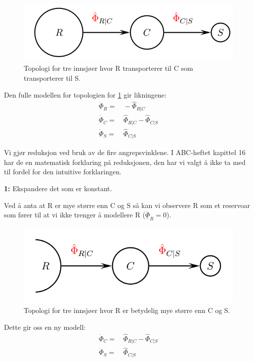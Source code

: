 \begin{figure}[H]
    \centering
    \includegraphics[scale=0.5]{Figures/time_scale_topo}
    \caption{Topologi for tre innsjøer hvor R transporterer til C som transporterer til S.}
    \label{fig:time_scale_topo}
\end{figure}

Den fulle modellen for topologien for \cref{fig:time_scale_topo} gir likningene:
\begin{align}
    \dot{\Phi}_{R} =&\, -\hat{\Phi}_{R|C} \\
    \dot{\Phi}_C =&\, \hat{\Phi}_{R|C} - \hat{\Phi}_{C|S}\\
    \dot{\Phi}_S =&\, \hat{\Phi}_{C|S}
\end{align}

Vi gjør reduksjon ved bruk av de fire angrepsvinklene. I ABC-heftet kapittel 16 har de en matematisk forklaring på reduksjonen, den har vi valgt å ikke ta med til fordel for den intuitive forklaringen.  

\begin{center}
    \textbf{1:} Ekspandere det som er konstant.
\end{center}
Ved å anta at R er mye større enn C og S så kan vi observere R som et reservoar som fører til at vi ikke trenger å modellere R ($\underline{\dot{\Phi}}_R = 0$).

\begin{figure}[H]
    \centering
    \includegraphics[scale=0.5]{Figures/time_scale_topo1.png}
    \caption{Topologi for tre innsjøer hvor R er betydelig mye større enn C og S.}
    \label{fig:time_scale_topo1}
\end{figure}
Dette gir oss en ny modell:
\begin{align}
    \dot{\Phi}_C =&\, \hat{\Phi}_{R|C} - \hat{\Phi}_{C|S}\\
    \dot{\Phi}_S =&\, \hat{\Phi}_{C|S}
\end{align}


